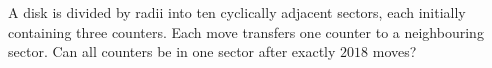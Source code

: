 A disk is divided by radii into ten cyclically adjacent sectors, each initially containing three counters. Each move transfers one counter to a neighbouring sector. Can all counters be in one sector after exactly $2018$ moves?
